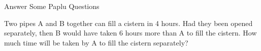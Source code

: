 \documentclass[addpoints,12pt]{exam}
\begin{document}
\begin{questions}
\question[20]
\vspace{3mm}Answer Some Paplu Questions
\question[5]
\vspace{3mm}Two pipes A and B together can fill a cistern in 4 hours. Had they been opened separately, then B would have taken 6 hours more than A to fill the cistern. How much time will be taken by A to fill the cistern separately?
\end{questions}
\end{document}
